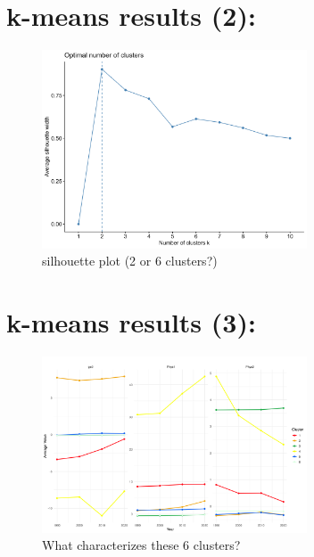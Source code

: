 \documentclass[
  letterpaper,
  DIV=11,
  numbers=noendperiod]{scrartcl}
\begin{document}
\hypertarget{k-means-results-2}{%
\section{k-means results (2):}\label{k-means-results-2}}

\begin{figure}

{\centering \includegraphics[width=0.7\textwidth,height=\textheight]{imgs/silhouette_plot.png}

}

\caption{silhouette plot (2 or 6 clusters?)}

\end{figure}

\hypertarget{k-means-results-3}{%
\section{k-means results (3):}\label{k-means-results-3}}

\begin{figure}

{\centering \includegraphics[width=0.7\textwidth,height=\textheight]{imgs/ClusterCharacteristicsB.png}

}

\caption{What characterizes these 6 clusters?}

\end{figure}
\end{document}
